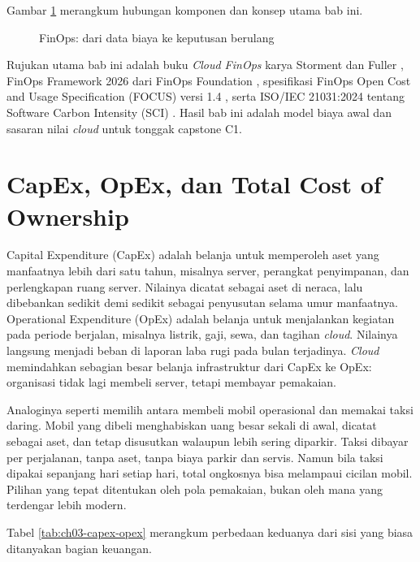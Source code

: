 Gambar \ref{fig:ch03-meja-biaya} merangkum hubungan komponen dan konsep utama bab ini.
\begin{figure}[!htb]
  \centering
  
  \caption{FinOps: dari data biaya ke keputusan berulang}
  \label{fig:ch03-meja-biaya}
\end{figure}

Rujukan utama bab ini adalah buku \textit{Cloud FinOps} karya Storment dan Fuller
\cite{storment2023}, FinOps Framework 2026 dari FinOps Foundation \cite{finops2026}, spesifikasi
FinOps Open Cost and Usage Specification (FOCUS) versi 1.4 \cite{c03-focus}, serta ISO/IEC
21031:2024 tentang Software Carbon Intensity (SCI) \cite{iso21031}. Hasil bab ini adalah model biaya
awal dan sasaran nilai \textit{cloud} untuk tonggak capstone C1.

\section{CapEx, OpEx, dan Total Cost of Ownership}

Capital Expenditure (CapEx) adalah belanja untuk memperoleh aset yang manfaatnya lebih dari satu
tahun, misalnya server, perangkat penyimpanan, dan perlengkapan ruang server. Nilainya dicatat
sebagai aset di neraca, lalu dibebankan sedikit demi sedikit sebagai penyusutan selama umur
manfaatnya. Operational Expenditure (OpEx) adalah belanja untuk menjalankan kegiatan pada periode
berjalan, misalnya listrik, gaji, sewa, dan tagihan \textit{cloud}. Nilainya langsung menjadi beban
di laporan laba rugi pada bulan terjadinya. \textit{Cloud} memindahkan sebagian besar belanja
infrastruktur dari CapEx ke OpEx: organisasi tidak lagi membeli server, tetapi membayar pemakaian.

Analoginya seperti memilih antara membeli mobil operasional dan memakai taksi daring. Mobil yang
dibeli menghabiskan uang besar sekali di awal, dicatat sebagai aset, dan tetap disusutkan walaupun
lebih sering diparkir. Taksi dibayar per perjalanan, tanpa aset, tanpa biaya parkir dan servis.
Namun bila taksi dipakai sepanjang hari setiap hari, total ongkosnya bisa melampaui cicilan mobil.
Pilihan yang tepat ditentukan oleh pola pemakaian, bukan oleh mana yang terdengar lebih modern.

Tabel \ref{tab:ch03-capex-opex} merangkum perbedaan keduanya dari sisi yang biasa ditanyakan bagian
keuangan.

